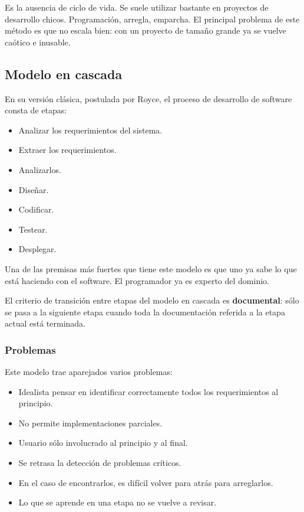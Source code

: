 \documentclass[]{article}
\begin{document}
Es la ausencia de ciclo de vida. Se suele utilizar bastante en proyectos de desarrollo chicos. Programación, arregla, emparcha. El principal problema de este método es que no escala bien: con un proyecto de tamaño grande ya se vuelve caótico e inusable.

\subsection{Modelo en cascada}

En su versión clásica, postulada por Royce, el proceso de desarrollo de software consta de etapas:
\begin{itemize}
	\item Analizar los requerimientos del sistema.
	\item Extraer los requerimientos.
	\item Analizarlos.
	\item Diseñar.
	\item Codificar.
	\item Testear.
	\item Desplegar.
\end{itemize}

Una de las premisas más fuertes que tiene este modelo es que uno ya sabe lo que está haciendo con el software. El programador ya es experto del dominio.

El criterio de transición entre etapas del modelo en cascada es \textbf{documental}: sólo se pasa a la siguiente etapa cuando toda la documentación referida a la etapa actual está terminada.

\subsubsection{Problemas}
Este modelo trae aparejados varios problemas:
\begin{itemize}
	\item Idealista pensar en identificar correctamente todos los requerimientos al principio.
	\item No permite implementaciones parciales.
	\item Usuario sólo involucrado al principio y al final.
	\item Se retrasa la detección de problemas críticos.
	\item En el caso de encontrarlos, es difícil volver para atrás para arreglarlos.
	\item Lo que se aprende en una etapa no se vuelve a revisar.
\end{itemize}
\end{document}

